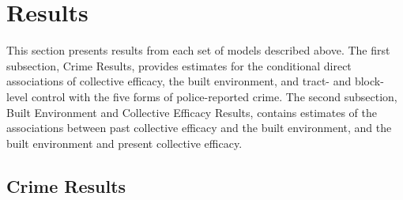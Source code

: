 \documentclass [11pt, proquest] {uwthesis}[2015/03/03]
\begin{document}
\hypertarget{results}{%
\section{Results}\label{results}}

This section presents results from each set of models described above. The first subsection, Crime Results, provides estimates for the conditional direct associations of collective efficacy, the built environment, and tract- and block-level control with the five forms of police-reported crime. The second subsection, Built Environment and Collective Efficacy Results, contains estimates of the associations between past collective efficacy and the built environment, and the built environment and present collective efficacy.

\hypertarget{crime-results}{%
\subsection{Crime Results}\label{crime-results}}
\end{document}
